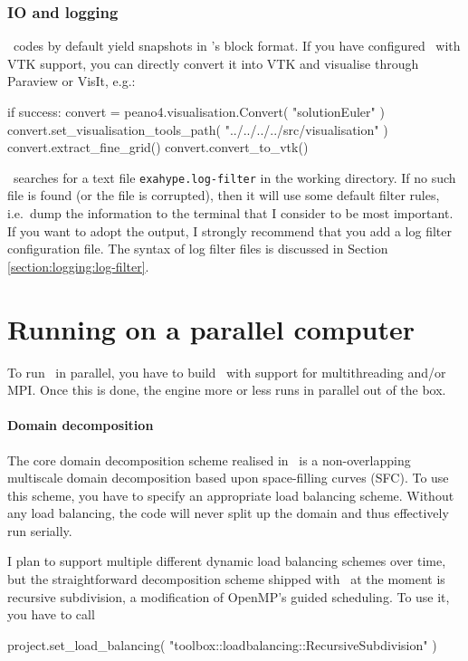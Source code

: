 \subsubsection{IO and logging}


\ExaHyPE\ codes by default yield snapshots in \Peano's block format. 
If you have configured \Peano\ with VTK support, you can directly convert it
into VTK and visualise through Paraview or VisIt, e.g.:
\begin{code}
if success:
  convert = peano4.visualisation.Convert( "solutionEuler" )
  convert.set_visualisation_tools_path( "../../../../src/visualisation" )
  convert.extract_fine_grid()
  convert.convert_to_vtk()
\end{code}


\ExaHyPE\ searches for a text file \texttt{exahype.log-filter} in the working
directory.
If no such file is found (or the file is corrupted), then it will use some
default filter rules, i.e.~dump the information to the terminal that I consider
to be most important.
If you want to adopt the output, I strongly recommend that you add a log filter
configuration file. 
The syntax of log filter files is discussed in Section
\ref{section:logging:log-filter}.



\section{Running on a parallel computer}

To run \ExaHyPE\ in parallel, you have to build \Peano\ with support for
multithreading and/or MPI.
Once this is done, the engine more or less runs in parallel out of the box.


\paragraph{Domain decomposition}
The core domain decomposition scheme realised in \ExaHyPE\ is a non-overlapping
multiscale domain decomposition based upon space-filling curves (SFC).
To use this scheme, you have to specify an appropriate load balancing scheme.
Without any load balancing, the code will never split up the domain and thus
effectively run serially.


I plan to support multiple different dynamic load balancing schemes over time,
but the straightforward decomposition scheme shipped with \Peano\ at the moment
is recursive subdivision, a modification of OpenMP's guided scheduling.
To use it, you have to call
\begin{code}
project.set_load_balancing( "toolbox::loadbalancing::RecursiveSubdivision" )
\end{code}

